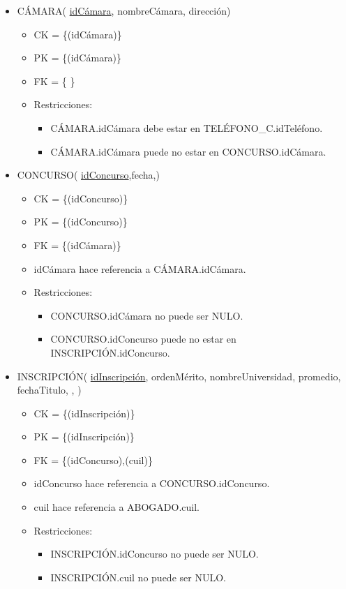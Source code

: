 \begin{itemize}
\item CÁMARA( \underline{idCámara}, nombreCámara, dirección)
	\begin{itemize}
		\item CK = \{(idCámara)\}
		\item PK = \{(idCámara)\}
		\item FK = \{ \}
		\item Restricciones:
			\begin{itemize}
			\item CÁMARA.idCámara debe estar en TELÉFONO\_C.idTeléfono.
			\item CÁMARA.idCámara puede no estar en CONCURSO.idCámara.
			\\			
			\end{itemize}
	\end{itemize}
		
	
\item CONCURSO( \underline{idConcurso},fecha,)
	\begin{itemize}
		\item CK = \{(idConcurso)\}
		\item PK = \{(idConcurso)\}
		\item FK = \{(idCámara)\}
		\item idCámara hace referencia a CÁMARA.idCámara.
		\item Restricciones:
			\begin{itemize}
			\item CONCURSO.idCámara no puede ser NULO.
			\item CONCURSO.idConcurso puede no estar en INSCRIPCIÓN.idConcurso.
			\\			
			\end{itemize}		
	\end{itemize}
	
	
\item INSCRIPCIÓN( \underline{idInscripción}, ordenMérito, nombreUniversidad, promedio, fechaTitulo, , )
	\begin{itemize}
		\item CK = \{(idInscripción)\}
		\item PK = \{(idInscripción)\}
		\item FK = \{(idConcurso),(cuil)\}
		\item idConcurso hace referencia a CONCURSO.idConcurso.
		\item cuil hace referencia a ABOGADO.cuil.
		\item Restricciones:
			\begin{itemize}
			\item INSCRIPCIÓN.idConcurso no puede ser NULO.
			\item INSCRIPCIÓN.cuil no puede ser NULO.
			\\
			\end{itemize}
	\end{itemize}
	

\end{itemize}
